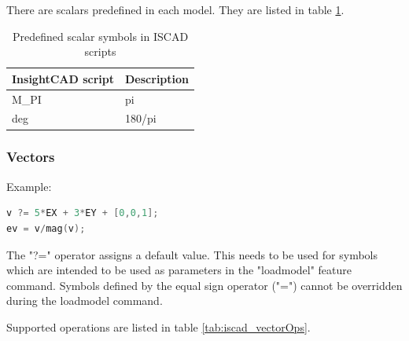 There are scalars predefined in each model. They are listed in table \ref{tab:iscad_scalars}.

\begin{table}[h!]
\centering
\begin{tabular}{ll}
InsightCAD script & Description \\
\hline
  M\_PI                    & pi \\
  deg                     & 180/pi \\
\end{tabular}
\caption{Predefined scalar symbols in ISCAD scripts}
\label{tab:iscad_scalars}
\end{table}

\subsubsection{Vectors}

Example:

\begin{lstlisting}[language=c++]
v ?= 5*EX + 3*EY + [0,0,1];
ev = v/mag(v);
\end{lstlisting}

The "?=" operator assigns a default value. This needs to be used for
symbols which are intended to be used as parameters in the "loadmodel"
feature command. Symbols defined by the equal sign operator ("=") cannot
be overridden during the loadmodel command.

Supported operations are listed in table \ref{tab:iscad_vectorOps}.

